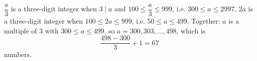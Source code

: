 $\dfrac a3$ is a three-digit integer when $3\mid a$ and $100\le\dfrac a3\le999$, i.e. $300\le a\le2997$. $2a$ is a three-digit integer when $100\le2a\le999$, i.e. $50\le a\le499$. Together: $a$ is a multiple of $3$ with $300\le a\le499$, so $a=300,303,\ldots,498$, which is
\[\dfrac{498-300}{3}+1=\boxed{67}\]
numbers.
